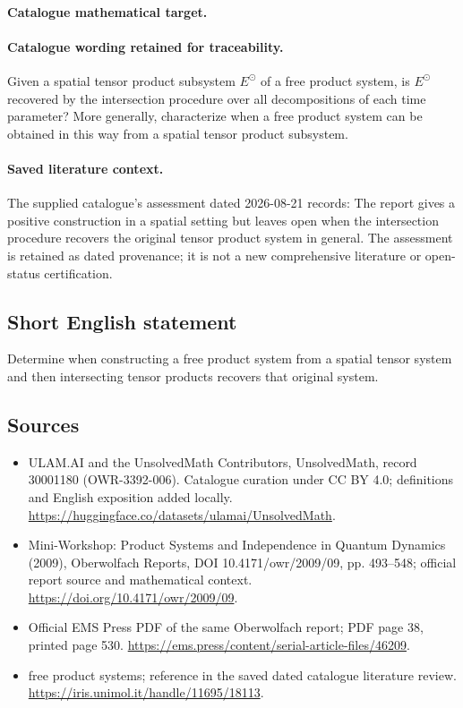 \documentclass[11pt]{article}
\begin{document}
\paragraph{Catalogue mathematical target.}
\paragraph{Catalogue wording retained for traceability.}
Given a spatial tensor product subsystem $E^{\odot}$ of a free product system, is $E^{\odot}$ recovered by the intersection procedure over all decompositions of each time parameter? More generally, characterize when a free product system can be obtained in this way from a spatial tensor product subsystem.

\paragraph{Saved literature context.} The supplied catalogue's assessment dated 2026-08-21 records: The report gives a positive construction in a spatial setting but leaves open when the intersection procedure recovers the original tensor product system in general. The assessment is retained as dated provenance; it is not a new comprehensive literature or open-status certification.
\subsection{Short English statement}
Determine when constructing a free product system from a spatial tensor system and then intersecting tensor products recovers that original system.
\subsection{Sources}
\begin{itemize}
\item[\hypertarget{source:30001180:1}{S1}] ULAM.AI and the UnsolvedMath Contributors, UnsolvedMath, record 30001180 (OWR-3392-006). Catalogue curation under CC BY 4.0; definitions and English exposition added locally.
\url{https://huggingface.co/datasets/ulamai/UnsolvedMath}.
\item[\hypertarget{source:30001180:2}{S2}] Mini-Workshop: Product Systems and Independence in Quantum Dynamics (2009), Oberwolfach Reports, DOI 10.4171/owr/2009/09, pp. 493--548; official report source and mathematical context.
\url{https://doi.org/10.4171/owr/2009/09}.
\item[\hypertarget{source:30001180:3}{S3}] Official EMS Press PDF of the same Oberwolfach report; PDF page 38, printed page 530.
\url{https://ems.press/content/serial-article-files/46209}.
\item[\hypertarget{source:30001180:4}{S4}] free product systems; reference in the saved dated catalogue literature review.
\url{https://iris.unimol.it/handle/11695/18113}.
\end{itemize}
\label{end:30001180}
\end{document}
